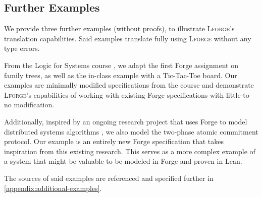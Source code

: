 \subsection{Further Examples}
We provide three further examples (without proofs), to illustrate \textsc{Lforge}'s translation capabilities. Said examples translate fully using \textsc{Lforge} without any type errors. 

From the Logic for Systems course \cite{l4s}, we adapt the first Forge assignment on family trees, as well as the in-class example with a Tic-Tac-Toe board. Our examples are minimally modified specifications from the course and demonstrate \textsc{Lforge}'s capabilities of working with existing Forge specifications with little-to-no modification. 

Additionally, inspired by an ongoing research project that uses Forge to model distributed systems algorithms \cite{distributedforge}, we also model the two-phase atomic commitment protocol. Our example is an entirely new Forge specification that takes inspiration from this existing research. This serves as a more complex example of a system that might be valuable to be modeled in Forge and proven in Lean. 

The sources of said examples are referenced and specified further in \cref{appendix:additional-examples}. 